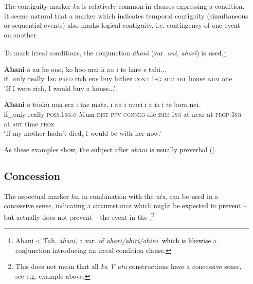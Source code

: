 The contiguity marker \textit{ka} is relatively common in clauses expressing a condition. It seems natural that a marker which indicates temporal contiguity (simultaneous or sequential events) also marks logical contiguity, i.e. contingency of one event on another.

To mark irreal conditions, the conjunction \textit{{\ꞌ}āhani} (var. \textit{{\ꞌ}ani, {\ꞌ}ahari}) is used.\footnote{\label{fn:534}{\ꞌ}Āhani {\textless} Tah. \textit{{\ꞌ}ahani}, a var. of \textit{{\ꞌ}ahari/{\ꞌ}ahiri/{\ꞌ}ahini}, which is likewise a conjunction introducing an irreal condition clause.}

\ea\label{ex:11.264}
\gll \textbf{{\ꞌ}Āhani} {\ꞌ}ō au he {\ꞌ}ono, ko ho{\ꞌ}o mai {\ꞌ}ā au i te hare e tahi... \\
if\_only really \textsc{1sg} \textsc{pred} rich \textsc{prf} buy hither \textsc{cont} \textsc{1sg} \textsc{acc} \textsc{art} house \textsc{num} one \\

\glt 
‘If I were rich, I would buy a house...’ \textstyleExampleref{[R399.182]} 
\z

\ea\label{ex:11.265}
\gll \textbf{{\ꞌ}Āhani} {\ꞌ}ō tō{\ꞌ}oku nua era i ta{\ꞌ}e mate,  {\ꞌ}ī au {\ꞌ}i muri i a ia {\ꞌ}i te hora nei.\\
if\_only really \textsc{poss.1sg.o} Mum \textsc{dist} \textsc{pfv} \textsc{conneg} die  \textsc{imm} \textsc{1sg} at near at \textsc{prop} \textsc{3sg} at \textsc{art} time \textsc{prox}\\

\glt
‘If my mother hadn’t died, I would be with her now.’ \textstyleExampleref{[R245.007]} 
\z

As these examples show, the subject after \textit{{\ꞌ}āhani} is usually preverbal (). 

\subsection{Concession}\label{sec:11.6.7}
The aspectual marker \textit{ka}, in combination with the  \textit{atu}, can be used in a concessive sense, indicating a circumstance which might be expected to prevent – but actually does not prevent – the event in the .\footnote{\label{fn:535}This does not mean that all \textit{ka V atu} constructions have a concessive sense, see e.g. example  above.}

